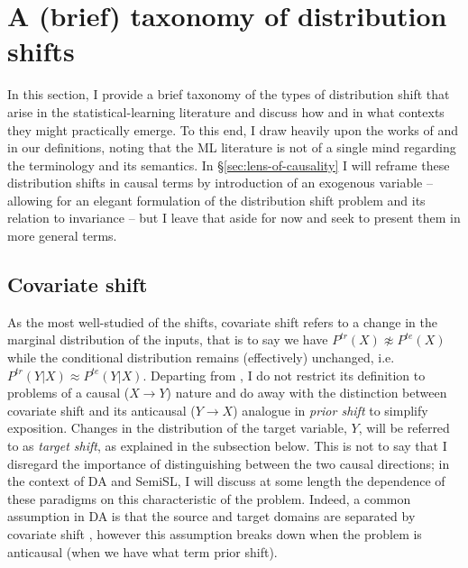 \section{A (brief) taxonomy of distribution shifts}\label{sec:dist-shift}
In this section, I provide a brief taxonomy of the types of distribution shift that arise in the
statistical-learning literature and discuss how and in what contexts they might practically emerge.
%
To this end, I draw heavily upon the works of \citet{moreno2012unifying} and
\citet{castro2020causality} in our definitions, noting that the \ac{ML} literature is not of a
single mind regarding the terminology and its semantics.
%
In \S\ref{sec:lens-of-causality} I will reframe these distribution shifts in causal terms by
introduction of an exogenous variable -- allowing for an elegant formulation of the distribution
shift problem and its relation to invariance -- but I leave that aside for now and seek to present
them in more general terms.
\subsection{Covariate shift}\label{ssec:covariate-shift}
As the most well-studied of the shifts, covariate shift refers to a change in the marginal
distribution of the inputs, that is to say we have \( P^{tr}(X) \not\approx P^{te}(X) \) while the
conditional distribution remains (effectively) unchanged, i.e. \( P^{tr}(Y|X) \approx P^{te}(Y|X)
\).
%
Departing from \citet{moreno2012unifying}, I do not restrict its definition to problems of a causal
(\( X \to Y\)) nature and do away with the distinction between covariate shift and its anticausal
(\( Y \to X \)) analogue in \emph{prior shift} to simplify exposition.
%
Changes in the distribution of the target variable, \(Y\), will be referred to as \emph{target
shift}, as explained in the subsection below.
%
This is not to say that I disregard the importance of distinguishing between the two causal
directions; in the context of \ac{DA} and \ac{SemiSL}, I will discuss at some length the dependence of these
paradigms on this characteristic of the problem.
%
Indeed, a common assumption in \ac{DA} is that the source and target domains are separated by covariate
shift \citep{david2010impossibility}, however this assumption breaks down when the problem is
anticausal (when we have what \cite{moreno2012unifying} term prior shift).

